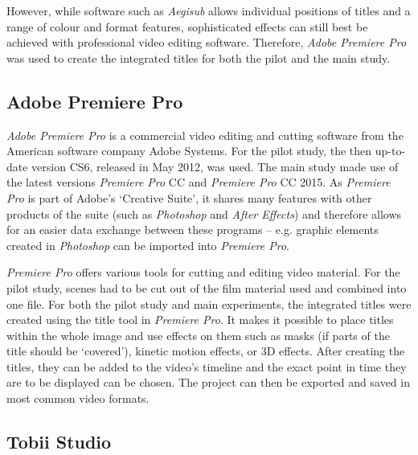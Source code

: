 However, while software such as \textit{Aegisub} allows individual positions of titles and a range of colour and format features, sophisticated effects can still best be achieved with professional video editing software. Therefore, \textit{Adobe Premiere Pro} was used to create the integrated titles for both the pilot and the main study.

\subsection{Adobe Premiere Pro}\label{sec:7.2.2}

\textit{Adobe Premiere Pro} is a commercial video editing and cutting software from the American software company Adobe Systems. For the pilot study, the then up-to-date version CS6, released in May 2012, was used. The main study made use of the latest versions \textit{Premiere Pro} CC and \textit{Premiere Pro} CC 2015. As \textit{Premiere Pro} is part of Adobe’s ‘Creative Suite’, it shares many features with other products of the suite (such as \textit{Photoshop} and \textit{After Effects}) and therefore allows for an easier data exchange between these programs – e.g. graphic elements created in \textit{Photoshop} can be imported into \textit{Premiere Pro}.

\textit{Premiere Pro} offers various tools for cutting and editing video material. For the pilot study, scenes had to be cut out of the film material used and combined into one file. For both the pilot study and main experiments, the integrated titles were created using the title tool in \textit{Premiere Pro}. It makes it possible to place titles within the whole image and use effects on them such as masks (if parts of the title should be ‘covered’), kinetic motion effects, or 3D effects. After creating the titles, they can be added to the video’s timeline and the exact point in time they are to be displayed can be chosen. The project can then be exported and saved in most common video formats.

\subsection{Tobii Studio}\label{sec:7.2.3}


